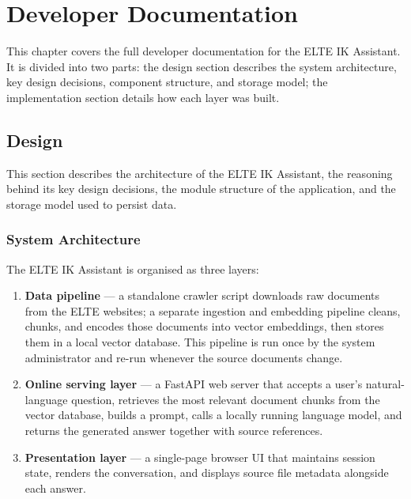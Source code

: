 \chapter{Developer Documentation}
\label{ch:devdocs}

This chapter covers the full developer documentation for the ELTE IK
Assistant. It is divided into two parts: the design section describes the
system architecture, key design decisions, component structure, and storage
model; the implementation section details how each layer was built.

\section{Design}
\label{sec:design}

This section describes the architecture of the ELTE IK Assistant, the
reasoning behind its key design decisions, the module structure of the
application, and the storage model used to persist data.

\subsection{System Architecture}
\label{sec:design-overview}

The ELTE IK Assistant is organised as three layers:

\begin{enumerate}
    \item \textbf{Data pipeline} — a standalone crawler script downloads
    raw documents from the ELTE websites; a separate ingestion and embedding
    pipeline cleans, chunks, and encodes those documents into vector embeddings,
    then stores them in a local vector database. This pipeline is run once by
    the system administrator and re-run whenever the source documents change.
    \item \textbf{Online serving layer} — a FastAPI web server that accepts a
    user's natural-language question, retrieves the most relevant document
    chunks from the vector database, builds a prompt, calls a locally running
    language model, and returns the generated answer together with source
    references.
    \item \textbf{Presentation layer} — a single-page browser UI that maintains
    session state, renders the conversation, and displays source file metadata
    alongside each answer.
\end{enumerate}

